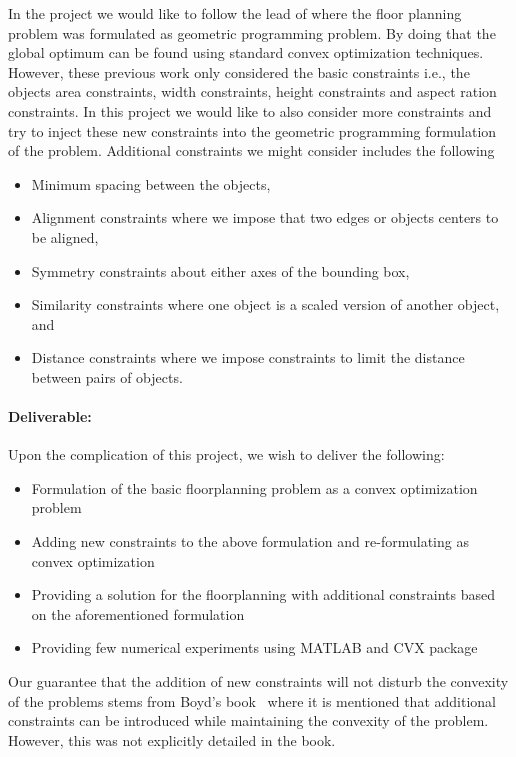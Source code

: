 \documentclass[12pt] {article}
\begin{document}
In the project we would like to follow the lead of \citep{moh1996globally, chen1998convex, young2000floorplan} where the floor planning problem was formulated as geometric programming problem. By doing that the global optimum can be found using standard convex optimization techniques. However, these previous work only considered the basic constraints i.e., the objects area constraints, width constraints, height constraints and aspect ration constraints. In this project we would like to also consider more constraints and try to inject these new constraints into the geometric programming formulation of the problem. Additional constraints we might consider includes the following 
\begin{itemize}
\item Minimum spacing between the objects,
\item Alignment constraints where we impose that two edges or objects centers to be aligned, 
\item Symmetry constraints about either axes of the bounding box, 
\item Similarity constraints where one object is a scaled version of another object, and 
\item Distance constraints where we impose constraints to limit the distance between pairs of objects. 
\end{itemize}

\paragraph{Deliverable:} Upon the complication of this project, we wish to deliver the following:
\begin{itemize}
\item Formulation of the basic floorplanning problem as a convex optimization problem
\item Adding new constraints to the above formulation and re-formulating as convex optimization
\item Providing a solution for the floorplanning with additional constraints based on the aforementioned formulation
\item Providing few numerical experiments using MATLAB and CVX package
\end{itemize}
Our guarantee that the addition of new constraints will not disturb the convexity of the problems stems from Boyd's book~\citep{boyd2004convex} where it is mentioned that additional constraints can be introduced while maintaining the convexity of the problem. However, this was not explicitly detailed in the book.


\end{document}
